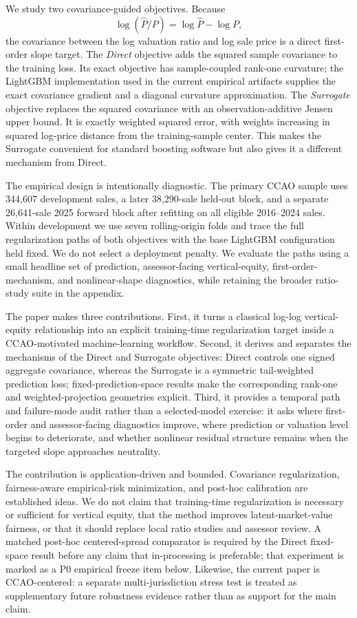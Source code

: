 \documentclass[10pt]{article}
\theoremstyle{definition}
\newcommand{\1}{\mathbf{1}}
\begin{document}
We study two covariance-guided objectives. Because
\[
\log(\widehat P/P)=\log \widehat P-\log P,
\]
the covariance between the log valuation ratio and log sale price is a direct first-order slope target. The \emph{Direct} objective adds the squared sample covariance to the training loss. Its exact objective has sample-coupled rank-one curvature; the LightGBM implementation used in the current empirical artifacts supplies the exact covariance gradient and a diagonal curvature approximation. The \emph{Surrogate} objective replaces the squared covariance with an observation-additive Jensen upper bound. It is exactly weighted squared error, with weights increasing in squared log-price distance from the training-sample center. This makes the Surrogate convenient for standard boosting software but also gives it a different mechanism from Direct.

The empirical design is intentionally diagnostic. The primary CCAO sample uses 344,607 development sales, a later 38,290-sale held-out block, and a separate 26,641-sale 2025 forward block after refitting on all eligible 2016--2024 sales. Within development we use seven rolling-origin folds and trace the full regularization paths of both objectives with the base LightGBM configuration held fixed. We do not select a deployment penalty. We evaluate the paths using a small headline set of prediction, assessor-facing vertical-equity, first-order-mechanism, and nonlinear-shape diagnostics, while retaining the broader ratio-study suite in the appendix.

The paper makes three contributions. First, it turns a classical log-log vertical-equity relationship into an explicit training-time regularization target inside a CCAO-motivated machine-learning workflow. Second, it derives and separates the mechanisms of the Direct and Surrogate objectives: Direct controls one signed aggregate covariance, whereas the Surrogate is a symmetric tail-weighted prediction loss; fixed-prediction-space results make the corresponding rank-one and weighted-projection geometries explicit. Third, it provides a temporal path and failure-mode audit rather than a selected-model exercise: it asks where first-order and assessor-facing diagnostics improve, where prediction or valuation level begins to deteriorate, and whether nonlinear residual structure remains when the targeted slope approaches neutrality.

The contribution is application-driven and bounded. Covariance regularization, fairness-aware empirical-risk minimization, and post-hoc calibration are established ideas. We do not claim that training-time regularization is necessary or sufficient for vertical equity, that the method improves latent-market-value fairness, or that it should replace local ratio studies and assessor review. A matched post-hoc centered-spread comparator is required by the Direct fixed-space result before any claim that in-processing is preferable; that experiment is marked as a P0 empirical freeze item below. Likewise, the current paper is CCAO-centered: a separate multi-jurisdiction stress test is treated as supplementary future robustness evidence rather than as support for the main claim.
\end{document}
